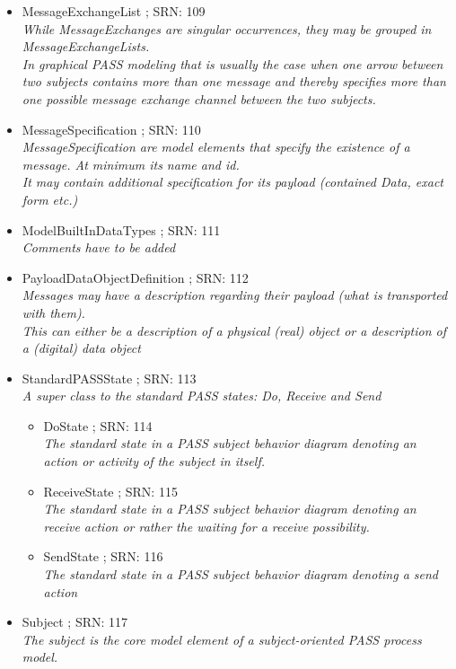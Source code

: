 \begin{itemize}
\begin{itemize}
\begin{itemize}
{		These are the typical conditions defined by Send transitions.}
	\end{itemize} 
	\item MessageExchangeList ; SRN: 109 \\ \textit{While MessageExchanges are singular occurrences, they may be grouped in MessageExchangeLists.\\
	In graphical PASS modeling that is usually the case when one arrow between two subjects contains more than one message and thereby specifies more than one possible message exchange channel between the two subjects.}
	\item MessageSpecification ; SRN: 110 \\ \textit{MessageSpecification are model elements that specify the existence of a message. At minimum its name and id.\\
	It may contain additional specification for its payload (contained Data, exact form etc.)}
	\item ModelBuiltInDataTypes ; SRN: 111 \\ \textit{Comments have to be added}
	\item PayloadDataObjectDefinition ; SRN: 112 \\ \textit{Messages may have a description regarding their payload (what is transported with them).\\
	This can either be a description of a physical (real) object or a description of a (digital) data object}
	\item StandardPASSState ; SRN: 113 \\ \textit{A super class to the standard PASS states: Do, Receive and Send}
	\begin{itemize}
		\item DoState ; SRN: 114 \\ \textit{The standard state in a PASS subject behavior diagram denoting an action or activity of the subject in itself.}
		\item ReceiveState ; SRN: 115 \\ \textit{The standard state in a PASS subject behavior diagram denoting an receive action or rather the waiting for a receive possibility.}
		\item SendState ; SRN: 116 \\ \textit{The standard state in a PASS subject behavior diagram denoting a send action}
	\end{itemize}
	\item Subject ; SRN: 117 \\ \textit{The subject is the core model element of a subject-oriented PASS process model.}

\end{itemize}
\end{itemize}
